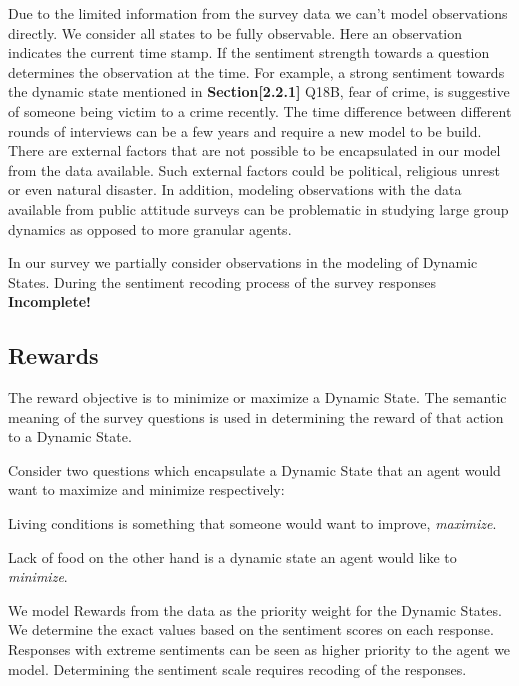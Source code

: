 {Due to the limited information from the survey data we can't model observations directly. We consider all states to be fully observable. Here an observation indicates the current time stamp. If the sentiment strength towards a question determines the observation at the time. For example, a strong sentiment towards the dynamic state mentioned in \textbf{Section[2.2.1]} Q18B, fear of crime, is suggestive of someone being victim to a crime recently. The time difference between different rounds of interviews can  be a few years and require a new model to be build. There are external factors that are not possible to be encapsulated in our model from the data available. Such external factors could be political, religious unrest or even natural disaster. In addition, modeling observations with the data available from public attitude surveys can be problematic in studying large group dynamics as opposed to more granular agents.

In our survey we partially consider observations in the modeling of Dynamic States. During the sentiment recoding process of the survey responses \textbf{Incomplete!}



\subsection{Rewards}

The reward objective is to minimize or maximize a Dynamic State. The semantic meaning of the survey questions is used in determining the reward of that action to a Dynamic State.

Consider two questions which encapsulate a Dynamic State that an agent would want to maximize and minimize respectively:


Living conditions is something that someone would want to improve, \textit{maximize}. 


Lack of food on the other hand is a dynamic state an agent would like to \textit{minimize}. 

We model Rewards from the data as the priority weight for the Dynamic States. We determine the exact values based on the sentiment scores on each response. Responses with extreme sentiments can be seen as higher priority to the agent we model. Determining the sentiment scale requires recoding of the responses.

}
